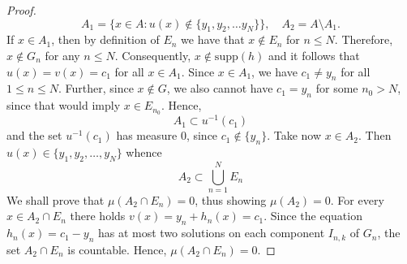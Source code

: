 \documentclass[10pt,a4paper]{amsart}
\numberwithin{equation}{section}
\begin{document}
\begin{proof}
    \begin{equation}
        \nonumber
        A_1=\{x\in A: u(x)\notin\{y_1,y_2,\ldots y_N\}\},\quad A_2=A\setminus A_1.
    \end{equation}
    If $x\in A_1$, then by definition of $E_n$ we have that $x\notin E_n$ for $n\le N$. Therefore, $x\notin G_n$ for any $n\le N$. Consequently, $x\notin\text{supp}(h)$ and it follows that $u(x)=v(x)=c_1$ for all $x\in A_1$.
    Since $x\in A_1$, we have $c_1\neq y_n$ for all $1\le n\le N$. Further, since $x\notin G$, we also cannot have $c_1=y_n$ for some $n_0>N$, since that would imply $x\in E_{n_0}$. Hence,
    $$
    A_1\subset u^{-1}(c_1)
    $$
    and the set $u^{-1}(c_1)$ has measure 0, since $c_1\notin\{y_n\}$.
    Take now $x\in A_2$. Then $u(x)\in\{y_1,y_2,\ldots,y_N\}$ whence
    \begin{equation}
        \nonumber
        A_2\subset \bigcup_{n=1}^NE_n
    \end{equation}
    We shall prove that $\mu(A_2\cap E_n)=0$, thus showing $\mu(A_2)=0$. For every $x\in A_2\cap E_n$ there holds $v(x)=y_n+h_n(x)=c_1$. Since the equation $h_n(x)=c_1-y_n$ has at most two solutions on each component $I_{n,k}$ of $G_n$, the set $A_2\cap E_n$ is countable. Hence, $\mu(A_2\cap E_n)=0$.    
\end{proof}
\end{document}
